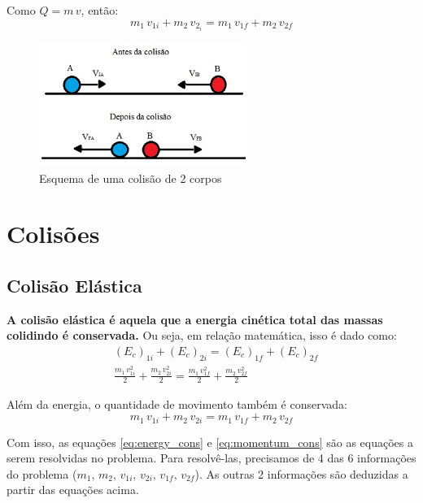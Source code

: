 \documentclass[12pt]{extarticle}
\newcommand{\<}{\langle}
\renewcommand{\>}{\rangle}
\theoremstyle{definition}
\begin{document}
Como $Q=m\,v$, então:
\begin{equation}
    m_1\,v_{1i} + m_2\,v_{2_i} = m_1\,v_{1f}+m_2\,v_{2f}
\end{equation}

\begin{figure}[H]
    \centering
    \includegraphics[width=0.6\textwidth]{colisao.jpg}
    \caption{Esquema de uma colisão de 2 corpos}
    \label{fig:colisao}
\end{figure}

\section{Colisões}
\subsection{Colisão Elástica}
\textbf{A colisão elástica é aquela que a energia cinética total das massas colidindo é conservada.} Ou seja, em relação matemática, isso é dado como:
\begin{equation}\label{eq:energy_cons}
    \begin{split}
        &(E_c)_{1i} + (E_c)_{2i} = (E_c)_{1f} + (E_c)_{2f}\\
        & \frac{m_1\,v_{1i}^2}{2} + \frac{m_2\,v_{2i}^2}{2} = \frac{m_1\,v_{1f}^2}{2} + \frac{m_2\,v_{2f}^2}{2}
    \end{split}
\end{equation}

Além da energia, o quantidade de movimento também é conservada:
\begin{equation}\label{eq:momentum_cons}
    m_1\,v_{1i} + m_2\,v_{2i} = m_1\,v_{1f} + m_2\,v_{2f}
\end{equation}

Com isso, as equações \ref{eq:energy_cons} e \ref{eq:momentum_cons} são as equações a serem resolvidas no problema. Para resolvê-las, precisamos de 4 das 6 informações do problema ($m_1,\,m_2,\,v_{1i},\,v_{2i},\,v_{1f},\,v_{2f}$). As outras 2 informações são deduzidas a partir das equações acima.
\end{document}
